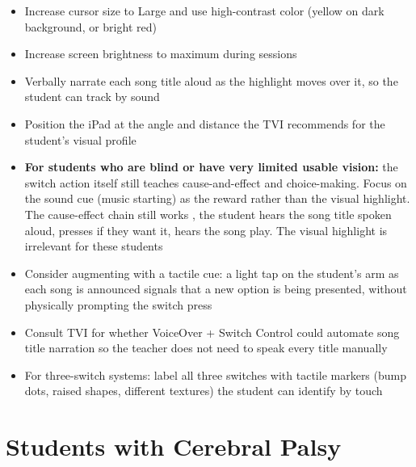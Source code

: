 \documentclass[justified,openright]{tufte-book}
\begin{document}
\begin{itemize}

\item
  Increase cursor size to Large and use high-contrast color (yellow on
  dark background, or bright red)
\item
  Increase screen brightness to maximum during sessions
\item
  Verbally narrate each song title aloud as the highlight moves over it,
  so the student can track by sound
\item
  Position the iPad at the angle and distance the TVI recommends for the
  student's visual profile
\item
  \textbf{For students who are blind or have very limited usable
  vision:} the switch action itself still teaches cause-and-effect and
  choice-making. Focus on the sound cue (music starting) as the reward
  rather than the visual highlight. The cause-effect chain still works
 , the student hears the song title spoken aloud, presses if they
  want it, hears the song play. The visual highlight is irrelevant for
  these students
\item
  Consider augmenting with a tactile cue: a light tap on the student's
  arm as each song is announced signals that a new option is being
  presented, without physically prompting the switch press
\item
  Consult TVI for whether VoiceOver + Switch Control could automate song
  title narration so the teacher does not need to speak every title
  manually
\item
  For three-switch systems: label all three switches with tactile
  markers (bump dots, raised shapes, different textures) the student can
  identify by touch
\end{itemize}

\section{Students with Cerebral
Palsy}\label{students-with-cerebral-palsy}

\end{document}
